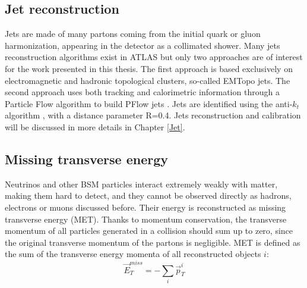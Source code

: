 \subsection{Jet reconstruction}
\label{chap2:Objects:Jet}
Jets are made of many partons coming from the initial quark or gluon harmonization, appearing in the detector as a collimated shower. Many jets reconstruction algorithms exist in ATLAS but only two approaches are of interest for the work presented in this thesis. The first approach is based exclusively on electromagnetic and hadronic topological clusters, so-called EMTopo jets. The second approach uses both tracking and calorimetric information through a Particle Flow algorithm to build PFlow jets \cite{Jet_Perf_Run2}. Jets are identified using the anti-$k_t$ algorithm \cite{Anti-Kt}, with a distance parameter R=0.4. Jets reconstruction and calibration will be discussed in more details in Chapter \ref{Jet}. 

\subsection{Missing transverse energy}
\label{chap2:Objects:MET}
Neutrinos and other BSM particles interact extremely weakly with matter, making them hard to detect, and they cannot be observed directly as hadrons, electrons or muons discussed before. Their energy is reconstructed as missing transverse energy (MET). Thanks to momentum conservation, the transverse momentum of all particles generated in a collision should sum up to zero, since the original transverse momentum of the partons is negligible. MET is defined as the sum of the transverse energy momenta of all reconstructed objects $i$: 
\begin{equation}
    \vec{E}_{T}^{m i s s}=-\sum_{i} \vec{p}_{T}^{i}
\end{equation}
